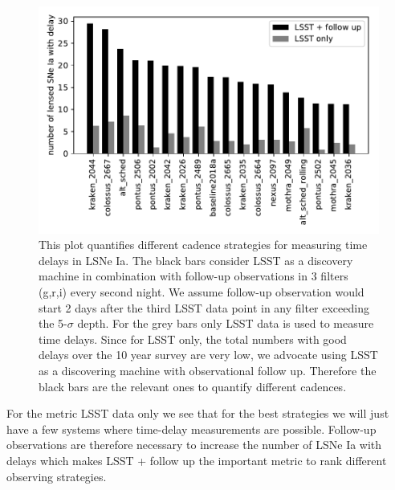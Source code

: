 %
\begin{figure}[h!]
\centering
\includegraphics[scale=1]{sl_MetricLSST.pdf}
\caption{This plot quantifies different cadence strategies for measuring time delays in LSNe Ia. The black bars consider LSST as a discovery machine in combination with follow-up observations in 3 filters (g,r,i) every second night. We assume follow-up observation would start 2 days after the third LSST data point in any filter exceeding the 5-$\sigma$ depth. For the grey bars only LSST data is used to measure time delays. Since for LSST only, the total numbers with good delays over the 10 year survey are very low, we advocate using LSST as a discovering machine with observational follow up. Therefore the black bars are the relevant ones to quantify different cadences.}
\label{fig:final results}
\end{figure}

For the metric LSST data only we see that for the best strategies we will just have
a few systems where time-delay measurements are possible. Follow-up observations are therefore necessary to
increase the number of LSNe Ia with delays which makes LSST + follow up the important metric to rank different observing strategies.


